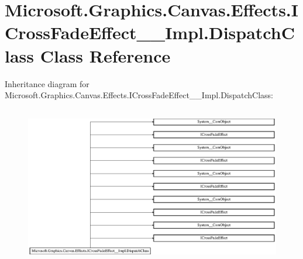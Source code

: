 \hypertarget{class_microsoft_1_1_graphics_1_1_canvas_1_1_effects_1_1_i_cross_fade_effect_____impl_1_1_dispatch_class}{}\section{Microsoft.\+Graphics.\+Canvas.\+Effects.\+I\+Cross\+Fade\+Effect\+\_\+\+\_\+\+Impl.\+Dispatch\+Class Class Reference}
\label{class_microsoft_1_1_graphics_1_1_canvas_1_1_effects_1_1_i_cross_fade_effect_____impl_1_1_dispatch_class}
Inheritance diagram for Microsoft.\+Graphics.\+Canvas.\+Effects.\+I\+Cross\+Fade\+Effect\+\_\+\+\_\+\+Impl.\+Dispatch\+Class\+:\begin{figure}[H]
\begin{center}
\leavevmode
\includegraphics[height=7.000000cm]{class_microsoft_1_1_graphics_1_1_canvas_1_1_effects_1_1_i_cross_fade_effect_____impl_1_1_dispatch_class}
\end{center}
\end{figure}

